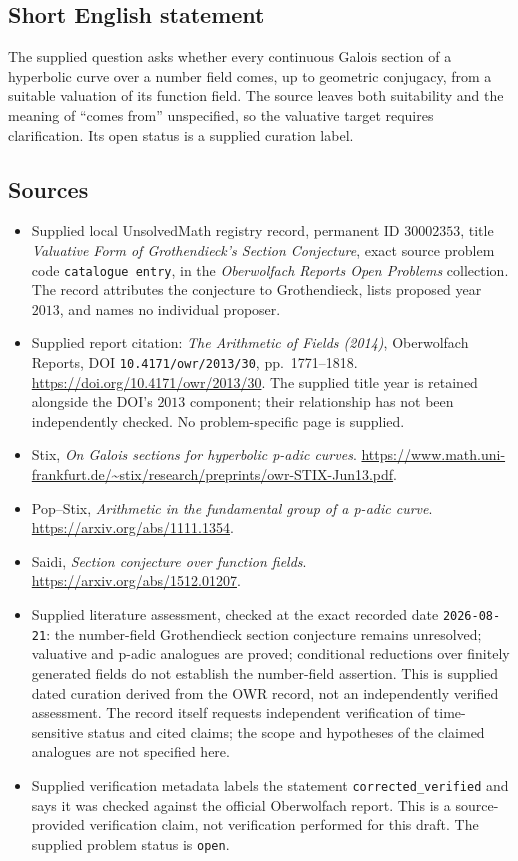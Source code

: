 \documentclass[11pt]{article}
\begin{document}
\subsection{Short English statement}
The supplied question asks whether every continuous Galois section of a hyperbolic curve over a number field comes, up to geometric conjugacy, from a suitable valuation of its function field. The source leaves both suitability and the meaning of ``comes from'' unspecified, so the valuative target requires clarification. Its open status is a supplied curation label.
\subsection{Sources}
\begin{itemize}
\item Supplied local UnsolvedMath registry record, permanent ID \(30002353\), title \emph{Valuative Form of Grothendieck's Section Conjecture}, exact source problem code \texttt{catalogue entry}, in the \emph{Oberwolfach Reports Open Problems} collection. The record attributes the conjecture to Grothendieck, lists proposed year \(2013\), and names no individual proposer.
\item Supplied report citation: \emph{The Arithmetic of Fields (2014)}, Oberwolfach Reports, DOI \texttt{10.4171/owr/2013/30}, pp.\ 1771--1818. \url{https://doi.org/10.4171/owr/2013/30}. The supplied title year is retained alongside the DOI's \(2013\) component; their relationship has not been independently checked. No problem-specific page is supplied.
\item Stix, \emph{On Galois sections for hyperbolic p-adic curves}. \url{https://www.math.uni-frankfurt.de/~stix/research/preprints/owr-STIX-Jun13.pdf}.
\item Pop--Stix, \emph{Arithmetic in the fundamental group of a p-adic curve}. \url{https://arxiv.org/abs/1111.1354}.
\item Saidi, \emph{Section conjecture over function fields}. \url{https://arxiv.org/abs/1512.01207}.
\item Supplied literature assessment, checked at the exact recorded date \texttt{2026-08-21}: the number-field Grothendieck section conjecture remains unresolved; valuative and p-adic analogues are proved; conditional reductions over finitely generated fields do not establish the number-field assertion. This is supplied dated curation derived from the OWR record, not an independently verified assessment. The record itself requests independent verification of time-sensitive status and cited claims; the scope and hypotheses of the claimed analogues are not specified here.
\item Supplied verification metadata labels the statement \texttt{corrected\_verified} and says it was checked against the official Oberwolfach report. This is a source-provided verification claim, not verification performed for this draft. The supplied problem status is \texttt{open}.
\end{itemize}
\end{document}
